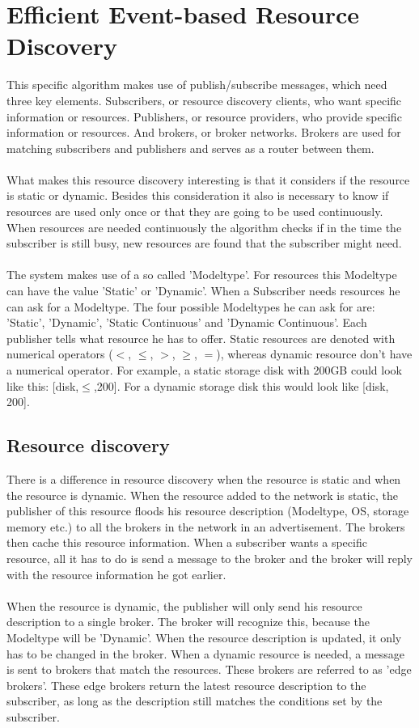 	\section{Efficient Event-based Resource Discovery}
		This specific algorithm makes use of publish/subscribe messages, which need three key elements.
		Subscribers, or resource discovery clients, who want specific information or resources. Publishers, or 
		resource providers, who provide specific information or resources. And brokers, or broker networks.
		Brokers are used for matching subscribers and publishers and serves as a router between them.\\
		\\
		What makes this resource discovery interesting is that it considers if the resource is static or 
		dynamic. Besides this consideration it also is necessary to know if resources are used only once or 
		that they are going to be used continuously. When resources are needed continuously the algorithm 
		checks if in the time the subscriber is still busy, new resources are found that the subscriber might 
		need. \\
		\\
		The system makes use of a so called 'Modeltype'. For resources this Modeltype can have the 
		value 'Static' or 'Dynamic'. When a Subscriber needs resources he can ask for a Modeltype. The four 
		possible Modeltypes he can ask for are: 'Static', 'Dynamic', 'Static Continuous' and 'Dynamic 
		Continuous'. Each publisher tells what resource he has to offer. Static resources are denoted with 
		numerical operators ($<$, $\le$, $>$, $\ge$, $=$), whereas dynamic resource don't have a numerical operator. For 
		example, a static storage disk with 200GB could look like this: [disk,$\le$,200]. For a dynamic storage 
		disk this would look like [disk, 200].
		
		\subsection{Resource discovery}
		There is a difference in resource discovery when the resource is static and when the resource is 
		dynamic. When the resource added to the network is static, the publisher of this resource floods his 
		resource description (Modeltype, OS, storage memory etc.) to all the brokers in the network in an 
		advertisement. The brokers then cache this resource information. When a subscriber wants a specific 
		resource, all it has to do is send a message to the broker and the broker will reply with the resource 
		information he got earlier.\\
		\\
		When the resource is dynamic, the publisher will only send his resource 
		description to a single broker. The broker will recognize this, because the Modeltype will be 'Dynamic'. When 
		the resource description is updated, it only has to be changed in the broker. When a dynamic 
		resource is needed, a message is sent to brokers that match the resources. These brokers are 
		referred to as 'edge brokers'. These edge brokers return the latest resource description to the 
		subscriber, as long as the description still matches the conditions set by the subscriber.
		
